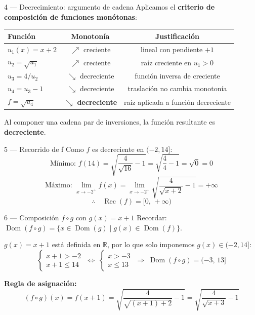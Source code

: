 \documentclass[letterpaper, 11pt]{article}
\begin{document}
\begin{paso}{4 — Decrecimiento: argumento de cadena}
Aplicamos el \textbf{criterio de composición de funciones monótonas}:

\begin{center}
\renewcommand{\arraystretch}{1.4}
\begin{tabular}{lcc}
    \hline
    \textbf{Función} & \textbf{Monotonía} & \textbf{Justificación} \\
    \hline
    $u_1(x)=x+2$ & $\nearrow$ creciente & lineal con pendiente $+1$ \\
    $u_2=\sqrt{u_1}$ & $\nearrow$ creciente & raíz creciente en $u_1>0$ \\
    $u_3=4/u_2$ & $\searrow$ decreciente & función inversa de creciente \\
    $u_4=u_3-1$ & $\searrow$ decreciente & traslación no cambia monotonía \\
    $f=\sqrt{u_4}$ & $\searrow$ \textbf{decreciente} & raíz aplicada a función decreciente \\
    \hline
\end{tabular}
\end{center}
\vspace{0.2cm}
Al componer una cadena par de inversiones, la función resultante es \textbf{decreciente}.
\end{paso}

\begin{paso}{5 — Recorrido de f}
Como $f$ es decreciente en $(-2,14]$:
\[
    \text{Mínimo: }f(14) = \sqrt{\frac{4}{\sqrt{16}}-1} = \sqrt{\frac{4}{4}-1} = \sqrt{0} = 0
\]
\[
    \text{Máximo: }\lim_{x\to-2^+}f(x)
    = \lim_{x\to-2^+}\sqrt{\frac{4}{\sqrt{x+2}}-1}
    = +\infty
\]
\[
    \therefore\quad \operatorname{Rec}(f) = [0,\,+\infty)
\]
\end{paso}

\begin{paso}{6 — Composición $f\circ g$ con $g(x)=x+1$}
Recordar: $\operatorname{Dom}(f\circ g)=\{x\in\operatorname{Dom}(g)\mid g(x)\in\operatorname{Dom}(f)\}$.

$g(x)=x+1$ está definida en $\mathbb{R}$, por lo que solo imponemos $g(x)\in(-2,14]$:
\[
    \begin{cases}
        x+1>-2 \\[2pt]
        x+1\leq 14
    \end{cases}
    \;\Longleftrightarrow\;
    \begin{cases}
        x>-3 \\[2pt]
        x\leq 13
    \end{cases}
    \;\Longrightarrow\;
    \operatorname{Dom}(f\circ g)=(-3,\,13]
\]

\textbf{Regla de asignación:}
\[
    (f\circ g)(x) = f(x+1)
    = \sqrt{\frac{4}{\sqrt{(x+1)+2}}-1}
    = \sqrt{\frac{4}{\sqrt{x+3}}-1}
\]
\end{paso}
\end{document}
